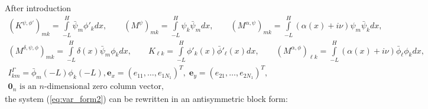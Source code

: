 After introduction 
\begin{align*}
\left(K^{\psi,\phi'}\right)_{mk}=\int\limits_{-L}^{H}\bar{\psi}_{m}\phi'_{k}dx,\qquad \left(M^{\psi}\right)_{mk}=\int\limits_{-L}^{H}\psi_{k}\bar{\psi}_{m}dx, \qquad 
\left(M^{\alpha,\psi}\right)_{mk}=\int\limits_{-L}^{H}(\alpha(x)+i\nu)\psi_{m}\bar{\psi}_{k}dx, \\
\left(M^{\delta,\psi,\phi}\right)_{mk}=\int\limits_{-L}^{H}\delta(x)\bar{\psi}_{m}\phi_{k}dx, \qquad 
K_{\ell k}=\int\limits_{-L}^{H}\phi'_{k}(x)\bar{\phi}'_{\ell}(x)dx,\qquad
\left(M^{\alpha,\phi}\right)_{\ell k}=\int\limits_{-L}^{H}(\alpha(x)+i\nu)\bar{\phi}_{\ell}\phi_{k}dx,\\
I_{km}^{\Gamma}=\bar{\phi}_{m}(-L)\phi_{k}(-L), 
\boldsymbol{e}_{x}=\left(e_{11},\ldots,e_{1 N_{1}}\right)^{T},\; \boldsymbol{e}_{y}=\left(e_{21},\ldots,e_{2 N_{1}}\right)^{T},\\
\boldsymbol{0}_{n} \text{ is an $n$-dimensional zero column vector},
\end{align*}
the system (\ref{eq:var_form2}) can be rewritten in an antisymmetric block form:
